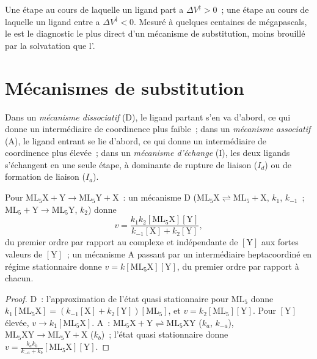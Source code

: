 Une étape au cours de laquelle un ligand part a $\Delta V^{\ddagger} > 0$~;
une étape au cours de laquelle un ligand entre a $\Delta V^{\ddagger}
< 0$. Mesuré à quelques centaines de mégapascals, le 
est le diagnostic le plus direct d'un mécanisme de substitution, moins
brouillé par la solvatation que l'.

\section{Mécanismes de substitution}

\begin{definition}\label{def:b3:complex-mechanisms:mechanisms}
Dans un \emph{mécanisme dissociatif} (D), le ligand
partant s'en va d'abord, ce qui donne un intermédiaire de coordinence plus
faible~; dans un \emph{mécanisme associatif} (A), le ligand
entrant se lie d'abord, ce qui donne un intermédiaire de coordinence plus
élevée~; dans un \emph{mécanisme d'échange} (I), les deux
ligands s'échangent en une seule étape, à dominante de rupture de liaison
($I_d$) ou de formation de liaison ($I_a$).
\end{definition}

\begin{proposition}\label{prop:b3:complex-mechanisms:d-a-laws}
Pour $\mathrm{ML_5X + Y \to ML_5Y + X}$~: un mécanisme D ($\mathrm{ML_5X} \rightleftharpoons \mathrm{ML_5} + \mathrm X$, $k_1$, $k_{-1}$~; $\mathrm{ML_5} + \mathrm Y
\to \mathrm{ML_5Y}$, $k_2$) donne
\[
  v = \frac{k_1k_2[\mathrm{ML_5X}][\mathrm Y]}{k_{-1}[\mathrm X] + k_2[\mathrm Y]},
\]
du premier ordre par rapport au complexe et indépendante de $[\mathrm Y]$
aux fortes valeurs de $[\mathrm Y]$~; un mécanisme A passant par un
intermédiaire heptacoordiné en régime stationnaire donne $v =
k[\mathrm{ML_5X}][\mathrm Y]$, du premier ordre par rapport à chacun.
\end{proposition}

\begin{proof}
D~: l'approximation de l'état quasi stationnaire pour $\mathrm{ML_5}$ donne $k_1[\mathrm{ML_5X}] = (k_{-1}[\mathrm X] + k_2[\mathrm Y])[\mathrm{ML_5}]$, et $v = k_2[\mathrm{ML_5}][\mathrm Y]$.
Pour $[\mathrm Y]$ élevée, $v \to k_1[\mathrm{ML_5X}]$. A~: $\mathrm{ML_5X} + \mathrm Y \rightleftharpoons \mathrm{ML_5XY}$ ($k_a$, $k_{-a}$), $\mathrm{ML_5XY} \to
\mathrm{ML_5Y} + \mathrm X$ ($k_b$)~; l'état quasi stationnaire donne $v = \frac{k_ak_b}{k_{-a} + k_b}[\mathrm{ML_5X}][\mathrm Y]$.
\end{proof}

